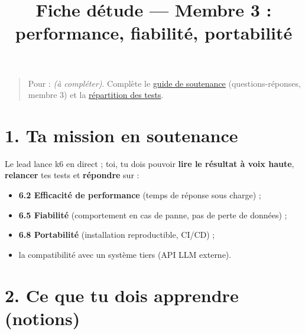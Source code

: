 \documentclass[
  11pt,
]{article}
\title{Fiche d\textquotesingle étude --- Membre 3 : performance,
fiabilité, portabilité}
\author{}
\date{}
\providecommand{\tightlist}{%
  \setlength{\itemsep}{0pt}\setlength{\parskip}{0pt}}
\let\tdmorigine\tableofcontents
\renewcommand{\tableofcontents}{\tdmorigine\newpage}
\begin{document}
\maketitle

\renewcommand*\contentsname{Table des matières}
{
\hypersetup{linkcolor=}
\setcounter{tocdepth}{3}
\tableofcontents
}
\begin{quote}
Pour : \emph{(à compléter)}. Complète le \href{SOUTENANCE.pdf}{guide de
soutenance} (questions-réponses, membre 3) et la
\href{REPARTITION_TESTS.pdf}{répartition des tests}.
\end{quote}

\section{1. Ta mission en soutenance}\label{1-ta-mission-en-soutenance}

Le lead lance k6 en direct ; toi, tu dois pouvoir \textbf{lire le
résultat à voix haute}, \textbf{relancer} tes tests et \textbf{répondre}
sur :

\begin{itemize}
\tightlist
\item
  \textbf{6.2 Efficacité de performance} (temps de réponse sous charge)
  ;
\item
  \textbf{6.5 Fiabilité} (comportement en cas de panne, pas de perte de
  données) ;
\item
  \textbf{6.8 Portabilité} (installation reproductible, CI/CD) ;
\item
  la compatibilité avec un système tiers (API LLM externe).
\end{itemize}

\section{2. Ce que tu dois apprendre
(notions)}\label{2-ce-que-tu-dois-apprendre-notions}
\end{document}
